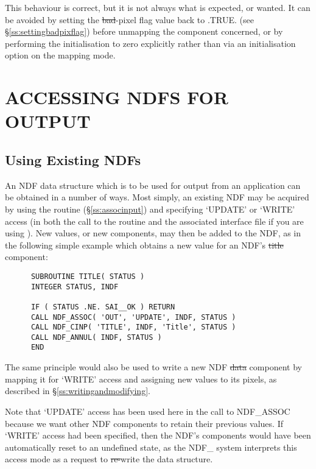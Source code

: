 This behaviour is correct, but it is not always what is expected, or wanted.
It can be avoided by setting the \st{bad}-pixel flag value back to
.TRUE. (see \S\ref{ss:settingbadpixflag}) before unmapping the
component concerned,
or by performing the initialisation to zero explicitly rather than via an
initialisation option on the mapping mode. 


\section{ACCESSING NDFS FOR OUTPUT}

\subsection{Using Existing NDFs}

An NDF data structure which is to be used for output from an application can
be obtained in a number of ways. 
Most simply, an existing NDF may be acquired by using the  routine
(\S\ref{ss:associnput}) and specifying `UPDATE' or `WRITE' access (in both the
call to the routine and the associated interface file if you are using
).
New values, or new components, may then be added to the NDF, as in the
following simple example which obtains a new value for an NDF's \st{title\/}
component: 

\small
\begin{verbatim}
      SUBROUTINE TITLE( STATUS )
      INTEGER STATUS, INDF

      IF ( STATUS .NE. SAI__OK ) RETURN
      CALL NDF_ASSOC( 'OUT', 'UPDATE', INDF, STATUS )
      CALL NDF_CINP( 'TITLE', INDF, 'Title', STATUS )
      CALL NDF_ANNUL( INDF, STATUS )
      END
\end{verbatim}
\normalsize

The same principle would also be used to write a new NDF \st{data\/}
component by mapping it for `WRITE' access and assigning new values to its
pixels, as described in \S\ref{ss:writingandmodifying}. 

Note that `UPDATE' access has been used here in the call to NDF\_ASSOC
because we want other NDF components to retain their previous values. 
If `WRITE' access had been specified, then the NDF's components would have
been automatically reset to an undefined state, as the NDF\_ system
interprets this access mode as a request to \st{re-\/}write the data
structure. 


